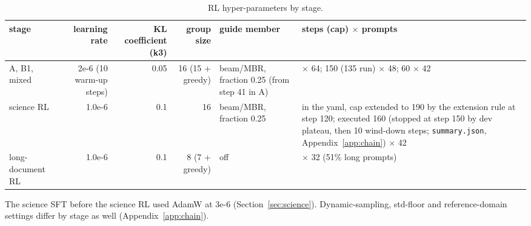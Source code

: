 \begin{table}[t]
\centering\scriptsize
\setlength{\tabcolsep}{4pt}
\caption{RL hyper-parameters by stage.}\label{tab:stagecfg_full}
\begin{tabularx}{\linewidth}{@{}lrrr>{\raggedright\arraybackslash}X>{\raggedright\arraybackslash}X@{}}
\toprule
stage & learning rate & KL coefficient (k3) & group size & guide member & steps (cap) $\times$ prompts \\
\midrule
A, B1, mixed & 2e-6 (10 warm-up steps) & 0.05 & 16 (15 + greedy) & beam/MBR, fraction 0.25 (from step 41 in A) & 400 $\times$ 64; 150 (135 run) $\times$ 48; 60 $\times$ 42 \\
science RL & 1.0e-6 & 0.1 & 16 & beam/MBR, fraction 0.25 & 150 in the yaml, cap extended to 190 by the extension rule at step 120; executed 160 (stopped at step 150 by dev plateau, then 10 wind-down steps; \texttt{summary.\allowbreak{}json}, Appendix~\ref{app:chain}) $\times$ 42 \\
long-document RL & 1.0e-6 & 0.1 & 8 (7 + greedy) & off & 80 $\times$ 32 (51\% long prompts) \\
\bottomrule
\end{tabularx}
\end{table}

The science SFT before the science RL used AdamW at 3e-6 (Section~\ref{sec:science}). Dynamic-sampling, std-floor and reference-domain settings differ by stage as well (Appendix~\ref{app:chain}). 


